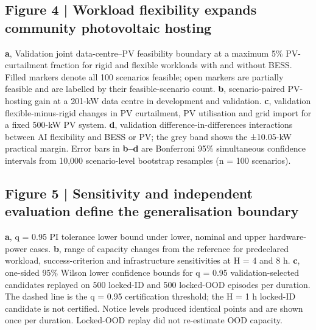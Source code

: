 \documentclass[10pt,a4paper]{article}
\begin{document}
\subsection*{Figure 4 | Workload flexibility expands community photovoltaic hosting}

\textbf{a}, Validation joint data-centre–PV feasibility boundary at a maximum 5\% PV-curtailment fraction for rigid and flexible workloads with and without BESS. Filled markers denote all 100 scenarios feasible; open markers are partially feasible and are labelled by their feasible-scenario count. \textbf{b}, scenario-paired PV-hosting gain at a 201-kW data centre in development and validation. \textbf{c}, validation flexible-minus-rigid changes in PV curtailment, PV utilisation and grid import for a fixed 500-kW PV system. \textbf{d}, validation difference-in-differences interactions between AI flexibility and BESS or PV; the grey band shows the ±10.05-kW practical margin. Error bars in \textbf{b–d} are Bonferroni 95\% simultaneous confidence intervals from 10,000 scenario-level bootstrap resamples (n = 100 scenarios).


\subsection*{Figure 5 | Sensitivity and independent evaluation define the generalisation boundary}

\textbf{a}, q = 0.95 PI tolerance lower bound under lower, nominal and upper hardware-power cases. \textbf{b}, range of capacity changes from the reference for predeclared workload, success-criterion and infrastructure sensitivities at H = 4 and 8 h. \textbf{c}, one-sided 95\% Wilson lower confidence bounds for q = 0.95 validation-selected candidates replayed on 500 locked-ID and 500 locked-OOD episodes per duration. The dashed line is the q = 0.95 certification threshold; the H = 1 h locked-ID candidate is not certified. Notice levels produced identical points and are shown once per duration. Locked-OOD replay did not re-estimate OOD capacity.
\end{document}
